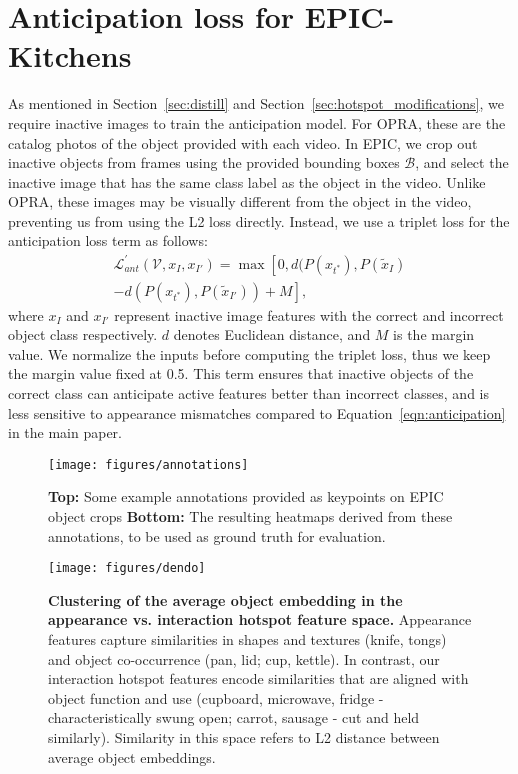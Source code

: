 \documentclass[10pt,twocolumn,letterpaper]{article}
\newcommand{\refeqn}[1]{Equation~\ref{#1}}
\newcommand{\refsec}[1]{Section~\ref{#1}}
\begin{document}
\section{Anticipation loss for EPIC-Kitchens} \label{sec:l_ant}
As mentioned in \refsec{sec:distill} and \refsec{sec:hotspot_modifications}, we require inactive images to train the anticipation model. For OPRA, these are the catalog photos of the object provided with each video. In EPIC, we crop out inactive objects from frames using the provided bounding boxes $\mathcal{B}$, and select the inactive image that has the same class label as the object in the video. Unlike OPRA, these images may be visually different from the object in the video, preventing us from using the L2 loss directly. Instead, we use a triplet loss for the anticipation loss term as follows:
\begin{equation*}
    \begin{split}
    \mathcal{L}^\prime_{ant}(\mathcal{V}, x_{I}, x_{I'}) =  \max \left [
        0, d(P(x_{t^*}), P(\widetilde{x}_I) \right. \\
        \left. - d(P(x_{t^*}), P(\widetilde{x}_{I'})) + M \right ],
    \end{split}
\label{eq:triplet}
\end{equation*}
where $x_I$ and $x_{I'}$ represent inactive image features with the correct and incorrect object class respectively. $d$ denotes Euclidean distance, and $M$ is the margin value. We normalize the inputs before computing the triplet loss, thus we keep the margin value fixed at 0.5. This term ensures that inactive objects of the correct class can anticipate active features better than incorrect classes, and is less sensitive to appearance mismatches compared to \refeqn{eqn:anticipation} in the main paper.


\begin{figure}[t!]
\centering
\texttt{[image: figures/annotations]}
\caption{\textbf{Top:} Some example annotations provided as keypoints on EPIC object crops \textbf{Bottom:} The resulting heatmaps derived from these annotations, to be used as ground truth for evaluation.}
\label{fig:annotations}
\end{figure}


\begin{figure*}[t!]
\centering
\texttt{[image: figures/dendo]}
\caption{\textbf{Clustering of the average object embedding in the appearance vs. interaction hotspot feature space.} Appearance features capture similarities in shapes and textures (knife, tongs) and object co-occurrence (pan, lid; cup, kettle). In contrast, our interaction hotspot features encode similarities that are aligned with object function and use (cupboard, microwave, fridge - characteristically swung open; carrot, sausage - cut and held similarly). Similarity in this space refers to L2 distance between average object embeddings.}
\label{fig:dendograms}
\end{figure*}
\end{document}
